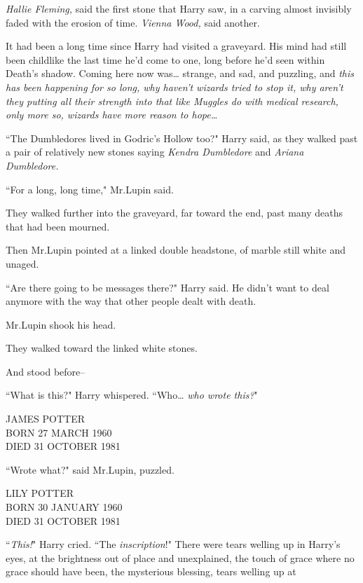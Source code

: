 \emph{Hallie Fleming,} said the first stone that Harry saw, in a carving almost invisibly faded with the erosion of time. \emph{Vienna Wood,} said another.

It had been a long time since Harry had visited a graveyard. His mind had still been childlike the last time he'd come to one, long before he'd seen within Death's shadow. Coming here now was{\ldots} strange, and sad, and puzzling, and \emph{this has been happening for so long, why haven't wizards tried to stop it, why aren't they putting all their strength into that like Muggles do with medical research, only more so, wizards have more reason to hope{\ldots}}

``The Dumbledores lived in Godric's Hollow too?" Harry said, as they walked past a pair of relatively new stones saying \emph{Kendra Dumbledore} and \emph{Ariana Dumbledore.}

``For a long, long time," Mr.\?Lupin said.

They walked further into the graveyard, far toward the end, past many deaths that had been mourned.

Then Mr.\?Lupin pointed at a linked double headstone, of marble still white and unaged.

``Are there going to be messages there?" Harry said. He didn't want to deal anymore with the way that other people dealt with death.

Mr.\?Lupin shook his head.

They walked toward the linked white stones.

And stood before\---

``What is this?" Harry whispered. ``Who{\ldots} \emph{who wrote this?}"

\begin{center}
JAMES POTTER\\
BORN 27 MARCH 1960\\
DIED 31 OCTOBER 1981
\end{center}

``Wrote what?" said Mr.\?Lupin, puzzled.

\begin{center}
LILY POTTER\\
BORN 30 JANUARY 1960\\
DIED 31 OCTOBER 1981
\end{center}

``\emph{This!}" Harry cried. ``The \emph{inscription}!" There were tears welling up in Harry's eyes, at the brightness out of place and unexplained, the touch of grace where no grace should have been, the mysterious blessing, tears welling up at

